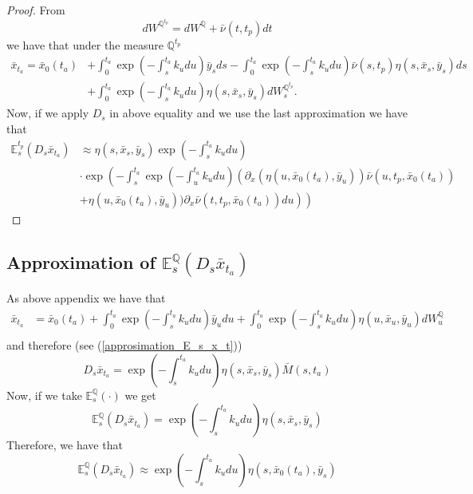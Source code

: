 \documentclass[a4paper,10pt]{article}
\newcommand{\1}{\mathbf{1}}
\begin{document}
\begin{proof}
From 
\begin{equation*}
dW^{\mathbb{Q}^{t_p}} = dW^{\mathbb{Q}} + \bar{\nu}(t,t_p) dt
\end{equation*}
we have that under the measure $\mathbb{Q}^{t_p}$ 
\begin{align*}
\bar{x}_{t_a} = \bar{x}_0(t_a) &+ \int_{0}^{t_a} \exp\left(-\int_{s}^{t_a}k_u du\right) \bar{y}_s ds - \int_{0}^{t_a} \exp\left(-\int_{s}^{t_a}k_u du\right) \bar{\nu}(s, t_p) \eta(s,\bar{x}_s,\bar{y}_s) ds   \\
&+ \int_{0}^{t_a}  \exp\left(-\int_{s}^{t_a}k_u du \right)\eta(s,\bar{x}_s,\bar{y}_s) dW_s^{\mathbb{Q}^{t_p}}. 
\end{align*}
Now, if we apply $D_s$ in above equality and we use the last approximation we have that
\begin{align*}
\mathbb{E}^{t_p}_s(D_s \bar{x}_{t_a}) &\approx \eta(s,\bar{x}_s,\bar{y}_s) \exp\left(-\int_{s}^{t_a}k_u du \right)\\ &\cdot \exp\left(-\int_{s}^{t_a} \exp\left(-\int_{u}^{t_a}k_u du\right)\left(\partial_x (\eta(u, \bar{x}_0(t_a), \bar{y}_{u})) \bar{\nu}(u,t_p, \bar{x}_0(t_a)) \right. \right.  \\
&+  \left. \left. \eta(u, \bar{x}_0(t_a), \bar{y}_{u})) \partial_x  \bar{\nu}(t,t_p, \bar{x}_0(t_a)) du \right)\right)
\end{align*}
\end{proof}



\subsection{Approximation of $\mathbb{E}_s^{\mathbb{Q}}\left(D_s \bar{x}_{t_a}\right)$}
As above appendix we have that
\begin{align*}
\bar{x}_{t_a} &= \bar{x}_0(t_a) + \int_{0}^{t_a} \exp\left(-\int_{s}^{t_a}k_u du\right) \bar{y}_u du + \int_{0}^{t_a} \exp\left(-\int_{s}^{t_a}k_u du \right) \eta(u,\bar{x}_u,\bar{y}_u) dW_u^{\mathbb{Q}}\\
\end{align*}
and therefore (see (\ref{approsimation_E_s_x_t}))
\begin{equation}
D_s \bar{x}_{t_a} =  \exp\left(-\int_{s}^{t_a}k_u du \right) \eta(s,\bar{x}_s,\bar{y}_{s})\bar{M}(s,t_a)
\end{equation}
Now, if we take $\mathbb{E}_s^{\mathbb{Q}}\left(\cdot\right)$ we get
\begin{equation}\label{approximation_spot_E_s_x_t}
\mathbb{E}^{\mathbb{Q}}_s\left(D_s \bar{x}_{t_a} \right)=\exp\left(-\int_{s}^{t_a}k_u du \right) \eta(s,\bar{x}_s,\bar{y}_{s})
\end{equation}
Therefore, we have that
\begin{equation}\label{approximation_spot_E_s_x_t}
\mathbb{E}^{\mathbb{Q}}_s\left(D_s \bar{x}_{t_a} \right) \approx \exp\left(-\int_{s}^{t_a}k_u du \right) \eta(s,\bar{x}_0(t_a),\bar{y}_{s})
\end{equation}
\end{document}
